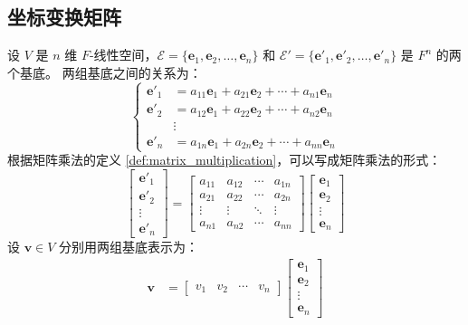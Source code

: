 \subsection{坐标变换矩阵}
\begin{definition}[坐标变换矩阵]
    设 $V$ 是 $n$ 维 $F$-线性空间，$\mathcal{E} = \{\mathbf{e}_1,\mathbf{e}_2,\ldots,\mathbf{e}_n\}$ 和 $\mathcal{E}' = \{\mathbf{e}'_1,\mathbf{e}'_2,\ldots,\mathbf{e}'_n\}$ 是 $F^n$ 的两个基底。
    两组基底之间的关系为：
    \[
        \begin{cases}
            \mathbf{e}'_1 &= a_{11}\mathbf{e}_1 + a_{21}\mathbf{e}_2 + \cdots + a_{n1}\mathbf{e}_n \\
            \mathbf{e}'_2 &= a_{12}\mathbf{e}_1 + a_{22}\mathbf{e}_2 + \cdots + a_{n2}\mathbf{e}_n \\
            &\vdots \\
            \mathbf{e}'_n &= a_{1n}\mathbf{e}_1 + a_{2n}\mathbf{e}_2 + \cdots + a_{nn}\mathbf{e}_n
        \end{cases}
    \]
    根据矩阵乘法的定义 \ref{def:matrix_multiplication}，可以写成矩阵乘法的形式：
    \[
        \begin{bmatrix}
            \mathbf{e}'_1 \\ \mathbf{e}'_2 \\ \vdots \\ \mathbf{e}'_n
        \end{bmatrix} =
        \begin{bmatrix}
            a_{11} & a_{12} & \cdots & a_{1n} \\
            a_{21} & a_{22} & \cdots & a_{2n} \\
            \vdots & \vdots & \ddots & \vdots \\
            a_{n1} & a_{n2} & \cdots & a_{nn}
        \end{bmatrix}
        \begin{bmatrix}
            \mathbf{e}_1 \\ \mathbf{e}_2 \\ \vdots \\ \mathbf{e}_n
        \end{bmatrix}
    \]
    设 $\mathbf{v}\in V$ 分别用两组基底表示为：
    \begin{align*}
        \mathbf{v} &= \begin{bmatrix}
            v_1 & v_2 & \cdots & v_n
        \end{bmatrix}\begin{bmatrix}
            \mathbf{e}_1 \\ \mathbf{e}_2 \\ \vdots \\ \mathbf{e}_n

\end{bmatrix}
\end{align*}
\end{definition}

